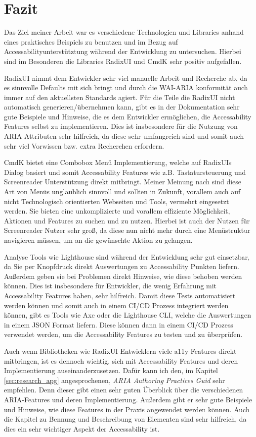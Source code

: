 \chapter{Fazit}
\label{Conclusion}

Das Ziel meiner Arbeit war es verschiedene Technologien und Libraries anhand eines praktisches Beispiels zu benutzen und im Bezug auf Accessabilityunterstütztung während der Entwicklung zu untersuchen. Hierbei sind im Besonderen die Libraries RadixUI und CmdK sehr positiv aufgefallen.

RadixUI nimmt dem Entwickler sehr viel manuelle Arbeit und Recherche ab, da es sinnvolle Defaults mit sich bringt und durch die WAI-ARIA konformität auch immer auf den aktuellsten Standards agiert. Für die Teile die RadixUI nicht automatisch generieren/übernehmen kann, gibt es in der Dokumentation sehr gute Beispiele und Hinweise, die es dem Entwickler ermöglichen, die Accessability Features selbst zu implementieren. Dies ist insbesondere für die Nutzung von ARIA-Attributen sehr hilfreich, da diese sehr umfangreich sind und somit auch sehr viel Vorwissen bzw. extra Recherchen erfordern.

CmdK bietet eine Combobox Menü Implementierung, welche auf RadixUIs Dialog basiert und somit Accessability Features wie z.B. Tastatursteuerung und Screenreader Unterstützung direkt mitbringt. Meiner Meinung nach sind diese Art von Menüs unglaublich sinnvoll und sollten in Zukunft, vorallem auch auf nicht Technologisch orientierten Webseiten und Tools, vermehrt eingesetzt werden. Sie bieten eine unkomplizierte und vorallem effiziente Möglichkeit, Aktionen und Features zu suchen und zu nutzen. Hierbei ist auch der Nutzen für Screenreader Nutzer sehr groß, da diese nun nicht mehr durch eine Menüstruktur navigieren müssen, um an die gewünschte Aktion zu gelangen.

Analyse Tools wie Lighthouse sind während der Entwicklung sehr gut einsetzbar, da Sie per Knopfdruck direkt Auswertungen zu Accessability Punkten liefern. Außerdem geben sie bei Problemen direkt Hinweise, wie diese behoben werden können. Dies ist insbesondere für Entwickler, die wenig Erfahrung mit Accessability Features haben, sehr hilfreich.
Damit diese Tests automatisiert werden können und somit auch in einem CI/CD Prozess integriert werden können, gibt es Tools wie Axe oder die Lighthouse CLI, welche die Auswertungen in einem JSON Format liefern. Diese können dann in einem CI/CD Prozess verwendet werden, um die Accessability Features zu testen und zu überprüfen.

Auch wenn Bibliotheken wie RadixUI Entwicklern viele a11y Features direkt mitbringen, ist es dennoch wichtig, sich mit Accessability Features und deren Implementierung auseinanderzusetzen. Dafür kann ich den, im Kapitel \ref{sec:research_apg} angesprochenen, \emph{ARIA Authoring Practices Guid} sehr empfehlen. Denn dieser gibt einen sehr guten Überblick über die verschiedenen ARIA-Features und deren Implementierung. Außerdem gibt er sehr gute Beispiele und Hinweise, wie diese Features in der Praxis angewendet werden können. Auch die Kapitel zu Bennung und Beschreibung von Elementen sind sehr hilfreich, da dies ein sehr wichtiger Aspekt der Accessability ist.